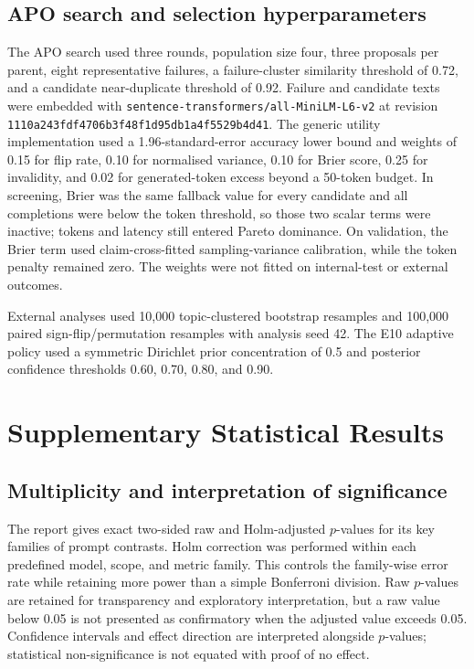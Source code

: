 \documentclass[11pt,twoside,a4paper]{report}
\begin{document}
\section{APO search and selection hyperparameters}

The APO search used three rounds, population size four, three proposals per
parent, eight representative failures, a failure-cluster similarity threshold
of 0.72, and a candidate near-duplicate threshold of 0.92.  Failure and
candidate texts were embedded with
\texttt{sentence-transformers/all-MiniLM-L6-v2} at revision
\texttt{1110a243fdf4706b3f48f1d95db1a4f5529b4d41}.  The generic utility
implementation used a 1.96-standard-error accuracy lower bound and weights of 0.15
for flip rate, 0.10 for normalised variance, 0.10 for Brier score, 0.25 for
invalidity, and 0.02 for generated-token excess beyond a 50-token budget.  In
screening, Brier was the same fallback value for every candidate and all completions
were below the token threshold, so those two scalar terms were inactive; tokens and
latency still entered Pareto dominance.  On validation, the Brier term used
claim-cross-fitted sampling-variance calibration, while the token penalty remained
zero.  The weights were not fitted on internal-test or external outcomes.

External analyses used 10,000 topic-clustered bootstrap resamples and 100,000
paired sign-flip/permutation resamples with analysis seed 42.  The E10 adaptive
policy used a symmetric Dirichlet prior concentration of 0.5 and posterior
confidence thresholds 0.60, 0.70, 0.80, and 0.90.


\chapter{Supplementary Statistical Results}
\label{app:statistics}

\section{Multiplicity and interpretation of significance}

The report gives exact two-sided raw and Holm-adjusted $p$-values for its key
families of prompt contrasts.  Holm correction was performed within each
predefined model, scope, and metric family.  This controls the family-wise
error rate while retaining more power than a simple Bonferroni division.  Raw
$p$-values are retained for transparency and exploratory interpretation, but a
raw value below 0.05 is not presented as confirmatory when the adjusted value
exceeds 0.05.  Confidence intervals and effect direction are interpreted
alongside $p$-values; statistical non-significance is not equated with proof of
no effect.
\end{document}
